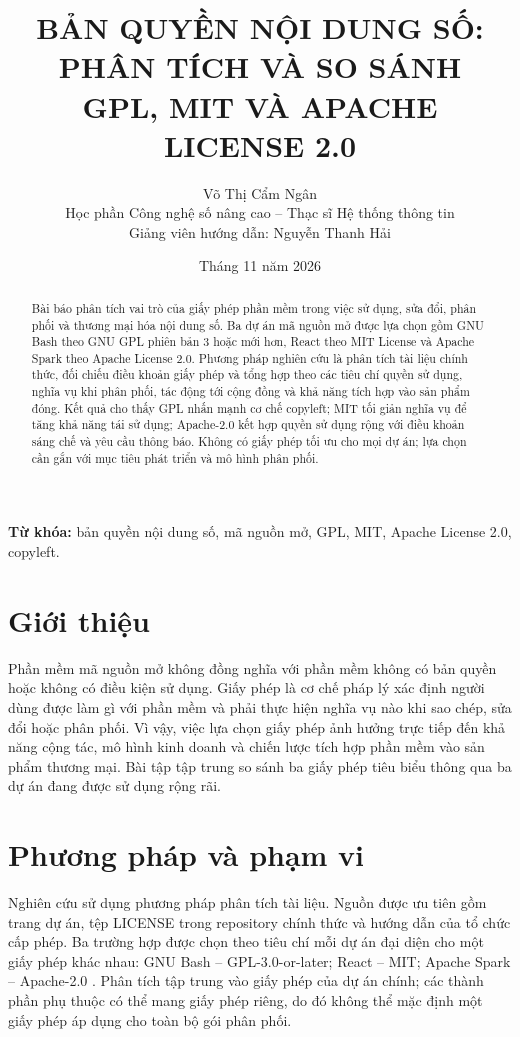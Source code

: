 \documentclass[12pt,a4paper]{article}
\title{\textbf{BẢN QUYỀN NỘI DUNG SỐ: PHÂN TÍCH VÀ SO SÁNH\\ GPL, MIT VÀ APACHE LICENSE 2.0}}
\author{Võ Thị Cẩm Ngân\\[2pt]\small Học phần Công nghệ số nâng cao -- Thạc sĩ Hệ thống thông tin\\\small Giảng viên hướng dẫn: Nguyễn Thanh Hải}
\date{Tháng 11 năm 2026}
\begin{document}
\maketitle

\begin{abstract}
Bài báo phân tích vai trò của giấy phép phần mềm trong việc sử dụng, sửa đổi, phân phối và thương mại hóa nội dung số. Ba dự án mã nguồn mở được lựa chọn gồm GNU Bash theo GNU GPL phiên bản 3 hoặc mới hơn, React theo MIT License và Apache Spark theo Apache License 2.0. Phương pháp nghiên cứu là phân tích tài liệu chính thức, đối chiếu điều khoản giấy phép và tổng hợp theo các tiêu chí quyền sử dụng, nghĩa vụ khi phân phối, tác động tới cộng đồng và khả năng tích hợp vào sản phẩm đóng. Kết quả cho thấy GPL nhấn mạnh cơ chế copyleft; MIT tối giản nghĩa vụ để tăng khả năng tái sử dụng; Apache-2.0 kết hợp quyền sử dụng rộng với điều khoản sáng chế và yêu cầu thông báo. Không có giấy phép tối ưu cho mọi dự án; lựa chọn cần gắn với mục tiêu phát triển và mô hình phân phối.
\end{abstract}

\noindent\textbf{Từ khóa:} bản quyền nội dung số, mã nguồn mở, GPL, MIT, Apache License 2.0, copyleft.

\section{Giới thiệu}
Phần mềm mã nguồn mở không đồng nghĩa với phần mềm không có bản quyền hoặc không có điều kiện sử dụng. Giấy phép là cơ chế pháp lý xác định người dùng được làm gì với phần mềm và phải thực hiện nghĩa vụ nào khi sao chép, sửa đổi hoặc phân phối. Vì vậy, việc lựa chọn giấy phép ảnh hưởng trực tiếp đến khả năng cộng tác, mô hình kinh doanh và chiến lược tích hợp phần mềm vào sản phẩm thương mại. Bài tập tập trung so sánh ba giấy phép tiêu biểu thông qua ba dự án đang được sử dụng rộng rãi.

\section{Phương pháp và phạm vi}
Nghiên cứu sử dụng phương pháp phân tích tài liệu. Nguồn được ưu tiên gồm trang dự án, tệp LICENSE trong repository chính thức và hướng dẫn của tổ chức cấp phép. Ba trường hợp được chọn theo tiêu chí mỗi dự án đại diện cho một giấy phép khác nhau: GNU Bash -- GPL-3.0-or-later; React -- MIT; Apache Spark -- Apache-2.0 \cite{bash,react,spark}. Phân tích tập trung vào giấy phép của dự án chính; các thành phần phụ thuộc có thể mang giấy phép riêng, do đó không thể mặc định một giấy phép áp dụng cho toàn bộ gói phân phối.
\end{document}
